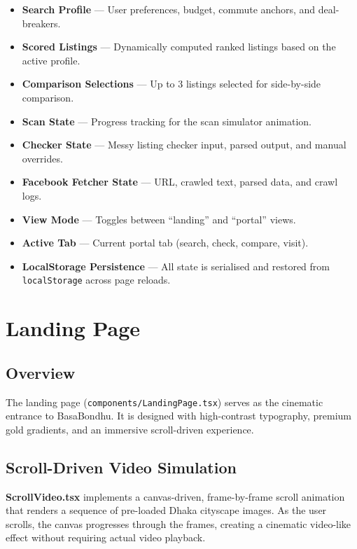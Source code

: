 \documentclass[12pt, a4paper, oneside]{report}
\newcommand{\filepath}[1]{\texttt{\small\color{codeblue}#1}}
\newcommand{\component}[1]{\textbf{\color{darkbg}#1}}
\begin{document}
\begin{itemize}[leftmargin=2em]
  \item \textbf{Search Profile} --- User preferences, budget, commute anchors, and deal-breakers.
  \item \textbf{Scored Listings} --- Dynamically computed ranked listings based on the active profile.
  \item \textbf{Comparison Selections} --- Up to 3 listings selected for side-by-side comparison.
  \item \textbf{Scan State} --- Progress tracking for the scan simulator animation.
  \item \textbf{Checker State} --- Messy listing checker input, parsed output, and manual overrides.
  \item \textbf{Facebook Fetcher State} --- URL, crawled text, parsed data, and crawl logs.
  \item \textbf{View Mode} --- Toggles between ``landing'' and ``portal'' views.
  \item \textbf{Active Tab} --- Current portal tab (search, check, compare, visit).
  \item \textbf{LocalStorage Persistence} --- All state is serialised and restored from \texttt{localStorage} across page reloads.
\end{itemize}


\chapter{Landing Page}

\section{Overview}

The landing page (\filepath{components/LandingPage.tsx}) serves as the cinematic entrance to BasaBondhu. It is designed with high-contrast typography, premium gold gradients, and an immersive scroll-driven experience.

\section{Scroll-Driven Video Simulation}

\component{ScrollVideo.tsx} implements a canvas-driven, frame-by-frame scroll animation that renders a sequence of pre-loaded Dhaka cityscape images. As the user scrolls, the canvas progresses through the frames, creating a cinematic video-like effect without requiring actual video playback.
\end{document}
